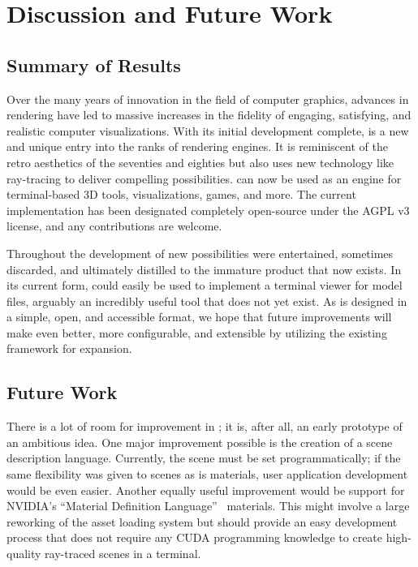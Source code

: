 %
%
%

\chapter{Discussion and Future Work}\label{ch:conclusion}

\section{Summary of Results}\label{ch:conclusion:summary}

Over the many years of innovation in the field of computer graphics, advances in rendering have led to massive increases in the fidelity of engaging, satisfying, and realistic computer visualizations.
With its initial development complete, \name{} is a new and unique entry into the ranks of rendering engines.
It is reminiscent of the retro aesthetics of the seventies and eighties but also uses new technology like ray-tracing to deliver compelling possibilities.
\name{} can now be used as an engine for terminal-based 3D tools, visualizations, games, and more.
The current implementation has been designated completely open-source under the AGPL v3 license, and any contributions are welcome.

Throughout the development of \name{} new possibilities were entertained, sometimes discarded, and ultimately distilled to the immature product that now exists.
In its current form, \name{} could easily be used to implement a terminal viewer for model files, arguably an incredibly useful tool that does not yet exist.
As \name{} is designed in a simple, open, and accessible format, we hope that future improvements will make \name{} even better, more configurable, and extensible by utilizing the existing framework for expansion.

\section{Future Work}\label{ch:conclusion:future}

There is a lot of room for improvement in \name{}; it is, after all, an early prototype of an ambitious idea.
One major improvement possible is the creation of a scene description language.
Currently, the scene must be set programmatically; if the same flexibility was given to scenes as is materials, user application development would be even easier.
Another equally useful improvement would be support for NVIDIA's ``Material Definition Language''~\cite{nvidia2015mdl} materials.
This might involve a large reworking of the asset loading system but should provide an easy development process that does not require any CUDA programming knowledge to create high-quality ray-traced scenes in a terminal.

